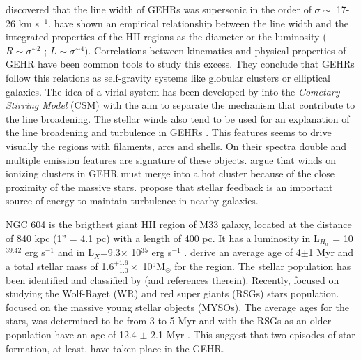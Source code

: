 \documentclass[fleqn,usenatbib]{mnras}
\newcommand\kms{$^{-1}$}
\begin{document}
\citet{smith1970} discovered that the line width of GEHRs was supersonic in the order of $\sigma \sim$ 17-26 km s\kms. \citet{melnick1977,terlevich1981} have shown an empirical relationship between the line width and the integrated properties of the HII regions as the diameter or the luminosity ($R \sim \sigma ^{\sim 2}$ ; $L \sim \sigma ^{\sim 4}$). Correlations between kinematics and physical properties of GEHR have been common tools to study this excess. They conclude that GEHRs follow this relations as self-gravity systems like globular clusters or elliptical galaxies. The idea of a virial system has been developed by \citet{1993ApJ...418..767T,munoz1996} into the \textit{Cometary Stirring Model} (CSM) with the aim to separate the mechanism that contribute to the line broadening. The stellar winds also tend to be used for an explanation of the line broadening and turbulence in GEHRs \citep{1994ApJ...425..720C}. This features seems to drive visually the regions with filaments, arcs and shells. On their spectra double and multiple emission features are signature of these objects. \cite{2020MNRAS.494...97S} argue that winds on ionizing clusters in GEHR must merge into a hot cluster because of the close proximity of the massive stars. \cite{2019ApJ...871...17U} propose that stellar feedback is an important source of energy to maintain turbulence in nearby galaxies.

NGC 604 is the brigthest giant HII region of M33 galaxy, located at the distance of 840 kpc (1'' = 4.1 pc) \citep{2015KamKinematics} with a length of 400 pc. It has a luminosity in L$_{H_\alpha}$ = 10$^{39.42}$ erg s$^{-1}$ \citep{2002MNRAS.329..481B} and in L$_{X}$=9.3$\times$ 10$^{35}$ erg s$^{-1}$ \citep{2008ApJ...685..919T}. \cite{2012ApJ...761....3M} derive an average age of 4$\pm$1 Myr and a total stellar mass of 1.6$^{+1.6}_{-1.0} \times$ 10$^{5}$M$_{\odot}$ for the region. The stellar population has been identified and classified by \cite{1996ApJ...456..174H} (and references therein). Recently, \citet{2011MNRAS.411..235E} focused on studying the Wolf-Rayet (WR) and red super giants (RSGs) stars population. \citet{2012AJ....143...43F} focused on the massive young stellar objects (MYSOs).  The average ages for the stars, was determined to be from 3 to 5 Myr \citep{1996ApJ...456..174H} and with the RSGs as an older population have an age of 12.4 $\pm$ 2.1 Myr \citep{2011MNRAS.411..235E}. This suggest that two episodes of star formation, at least, have taken place in the GEHR.
\end{document}
